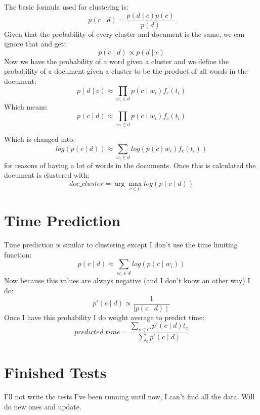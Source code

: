 \documentclass[11pt,a4paper]{article}
\begin{document}
The basic formula used for clustering is:
\begin{equation}
  p(c \mid d) = \frac{p(d \mid c) p(c)}{p(d)}
\end{equation}
Given that the probability of every cluster and document is the same, we can ignore that and get:
\begin{equation}
  p(c \mid d) \propto p(d \mid c)
\end{equation}
Now we have the probability of a word given a cluster and we define the probability of a document given a cluster to be the product of all words in the document:
\begin{equation}
  p(d \mid c) \approx \prod_{w_i \in d}{p(c \mid w_i) f_c(t_i)}
\end{equation}
Which means:
\begin{equation}
	p(c \mid d) \approx \prod_{w_i \in d}{p(c \mid w_i) f_c(t_i)}
\end{equation}

Which is changed into:
\begin{equation}
  log(p(c \mid d)) \approx \sum_{w_i \in d}{log(p(c \mid w_i) f_c(t_i))}
\end{equation}
for reasons of having a lot of words in the documents. Once this is calculated the document is clustered with:
\begin{equation}
  doc\_cluster = \arg\max_{c \in C} log(p(c \mid d))
\end{equation}

\section{Time Prediction}
Time prediction is similar to clustering except I don't use the time limiting function:
\begin{equation}
	p(c \mid d) \approx \sum_{w_i \in d}{log(p(c \mid w_i))}
\end{equation}
Now because this values are always negative (and I don't know an other way) I do:
\begin{equation}
	p'(c \mid d) \propto \frac{1}{\mid p(c \mid d) \mid}
\end{equation}
Once I have this probability I do weight average to predict time:
\begin{equation}
	predicted\_time = \frac{\sum_{c \in C}{p'(c \mid d)t_c}}{\sum_c{p'(c \mid d)}}
\end{equation}

\section{Finished Tests}
I'll not write the tests I've been running until now, I can't find all the data. Will do new ones and update.
\end{document}
